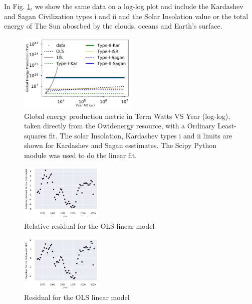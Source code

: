 \documentclass[final,5p,times,twocolumn,authoryear]{elsarticle}
\begin{document}
In Fig. \ref{fig:kardashev3}, we show the same data on a log-log plot and include the Kardashev and Sagan Civilization types i and ii and the Solar Insolation value or the total energy of The Sun abosrbed by the clouds, oceans and Earth's surface. %


\begin{figure}
    \centering
    \includegraphics[width=0.5\textwidth]{figs/fig2_kar.jpg}
    \caption{Global energy production metric in Terra Watts VS Year (log-log), taken directly from the Owidenergy resource, with a Ordinary Least-squares fit. The solar Insolation, Kardashev types i and ii limits are shown for Kardashev and Sagan esstimates. The Scipy Python module was used to do the linear fit.}
    \label{fig:kardashev3}

\end{figure}

\begin{figure}
    \centering
    \includegraphics[width=0.35\textwidth]{figs/fig1p_kar_rel_res.jpg}
    \caption{Relative residual for the OLS
    linear model}
    \label{fig:kardashev1_rel_res}

\end{figure}

\begin{figure}
    \centering
    \includegraphics[width=0.35\textwidth]{figs/fig1p_kar_res.jpg}
    \caption{Residual for the OLS
    linear model}
    \label{fig:kardashev1_res}

\end{figure}
\end{document}
